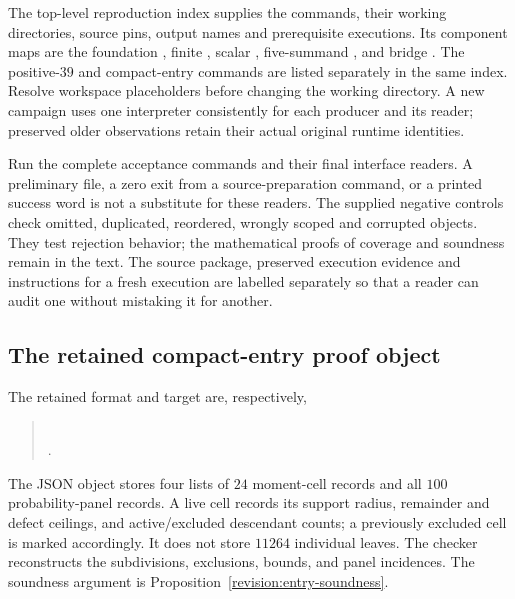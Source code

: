 The top-level reproduction index supplies the commands, their working
directories, source pins, output names and prerequisite executions. Its
component maps are the foundation , finite
, scalar
, five-summand
, and bridge .
The positive-$39$ and compact-entry commands are listed separately in the
same index. Resolve workspace placeholders before changing the working
directory. A new campaign uses one interpreter consistently for each
producer and its reader; preserved older observations retain their actual
original runtime identities.

Run the complete acceptance commands and their final interface readers.
A preliminary file, a zero exit from a source-preparation command, or a
printed success word is not a substitute for these readers. The supplied
negative controls check omitted, duplicated, reordered, wrongly scoped and
corrupted objects. They test rejection behavior; the mathematical proofs of
coverage and soundness remain in the text. The source package, preserved
execution evidence and instructions for a fresh execution are labelled
separately so that a reader can audit one without mistaking it for another.

\subsection{The retained compact-entry proof object}
The retained format and target are, respectively,
\begin{quote}\small
{}\\
.
\end{quote}
The JSON object stores
four lists of $24$ moment-cell records and all $100$ probability-panel
records. A live cell records its support radius, remainder and defect
ceilings, and active/excluded descendant counts; a previously excluded
cell is marked accordingly. It does not store $11264$ individual leaves.
The checker reconstructs the subdivisions, exclusions, bounds, and
panel incidences. The soundness argument is
Proposition~\ref{revision:entry-soundness}.

